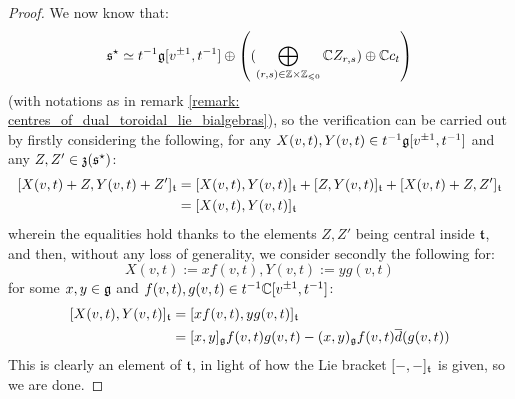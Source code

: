                 \begin{proof}
                    We now know that:
                        $$\s^{\star} \cong t^{-1}\g[v^{\pm 1}, t^{-1}] \oplus \left( ( \bigoplus_{(r, s) \in \Z \x \Z_{\leq 0}} \bbC Z_{r, s}) \oplus \bbC c_t \right)$$
                    (with notations as in remark \ref{remark: centres_of_dual_toroidal_lie_bialgebras}), so the verification can be carried out by firstly considering the following, for any $X(v, t), Y(v, t) \in t^{-1}\mathfrak{g}[v^{\pm 1}, t^{-1}]$ and any $Z, Z' \in \mathfrak{z}(\mathfrak{s}^{\star})$:
                        $$
                            \begin{aligned}
                                [ X(v, t) + Z, Y(v, t) + Z' ]_{\t} & = [ X(v, t), Y(v, t) ]_{\t} + [ Z, Y(v, t) ]_{\t} + [X(v, t) + Z, Z']_{\t}
                                \\
                                & = [ X(v, t), Y(v, t) ]_{\t}
                            \end{aligned}
                        $$
                    wherein the equalities hold thanks to the elements $Z, Z'$ being central inside $\mathfrak{t}$, and then, without any loss of generality, we consider secondly the following for:
                        $$X(v, t) := x f(v, t), Y(v, t) := y g(v, t)$$
                    for some $x, y \in \mathfrak{g}$ and $f(v, t), g(v, t) \in t^{-1}\mathbb{C}[v^{\pm 1}, t^{-1}]$:
                        $$
                            \begin{aligned}
                                [ X(v, t), Y(v, t) ]_{\t} & = [ x f(v, t), y g(v, t) ]_{\t}
                                \\
                                & = [x, y]_{\g} f(v, t) g(v, t) - (x, y)_{\g} f(v, t) \overline{d}( g(v, t) )
                            \end{aligned}
                        $$
                    This is clearly an element of $\mathfrak{t}$, in light of how the Lie bracket $[-, -]_{\mathfrak{t}}$ is given, so we are done. 
                \end{proof}

